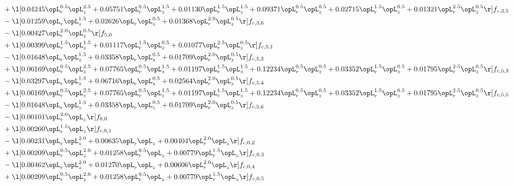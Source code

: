 \begin{alignat}{2}
& + \l[  0.04245 \opL_r^{0.5} \opL_z^{2.5} +  0.05751 \opL_r^{0.5} \opL_z^{1.5} +  0.01130 \opL_r^{1.5} \opL_z^{1.5} +  0.09371 \opL_r^{0.5} \opL_z^{0.5} +  0.02715 \opL_r^{1.5} \opL_z^{0.5} +  0.01321 \opL_r^{2.5} \opL_z^{0.5}  \r] f_{c,3,5} \nonumber \\ 
& - \l[  0.01259 \opL_r \opL_z^{1.5} +  0.02626 \opL_r \opL_z^{0.5} +  0.01368 \opL_r^{2.0} \opL_z^{0.5}  \r] f_{c,3,6} \nonumber \\ 
& - \l[  0.00427 \opL_r^{2.0} \opL_z^{0.5}  \r] f_{5,0} \nonumber \\ 
& + \l[  0.00399 \opL_r^{1.5} \opL_z^{1.5} +  0.01117 \opL_r^{1.5} \opL_z^{0.5} +  0.01077 \opL_r^{2.5} \opL_z^{0.5}  \r] f_{c,5,1} \nonumber \\ 
& - \l[  0.01648 \opL_r \opL_z^{1.5} +  0.03358 \opL_r \opL_z^{0.5} +  0.01709 \opL_r^{2.0} \opL_z^{0.5}  \r] f_{c,5,2} \nonumber \\ 
& + \l[  0.06169 \opL_r^{0.5} \opL_z^{2.5} +  0.07765 \opL_r^{0.5} \opL_z^{1.5} +  0.01197 \opL_r^{1.5} \opL_z^{1.5} +  0.12234 \opL_r^{0.5} \opL_z^{0.5} +  0.03352 \opL_r^{1.5} \opL_z^{0.5} +  0.01795 \opL_r^{2.5} \opL_z^{0.5}  \r] f_{c,5,3} \nonumber \\ 
& - \l[  0.03297 \opL_r \opL_z^{1.5} +  0.06716 \opL_r \opL_z^{0.5} +  0.02564 \opL_r^{2.0} \opL_z^{0.5}  \r] f_{c,5,4} \nonumber \\ 
& + \l[  0.06169 \opL_r^{0.5} \opL_z^{2.5} +  0.07765 \opL_r^{0.5} \opL_z^{1.5} +  0.01197 \opL_r^{1.5} \opL_z^{1.5} +  0.12234 \opL_r^{0.5} \opL_z^{0.5} +  0.03352 \opL_r^{1.5} \opL_z^{0.5} +  0.01795 \opL_r^{2.5} \opL_z^{0.5}  \r] f_{c,5,5} \nonumber \\ 
& - \l[  0.01648 \opL_r \opL_z^{1.5} +  0.03358 \opL_r \opL_z^{0.5} +  0.01709 \opL_r^{2.0} \opL_z^{0.5}  \r] f_{c,5,6} \nonumber \\ 
& - \l[  0.00101 \opL_r^{2.0} \opL_z  \r] f_{0,0} \nonumber \\ 
& + \l[  0.00260 \opL_r^{1.5} \opL_z  \r] f_{c,0,1} \nonumber \\ 
& - \l[  0.00231 \opL_r \opL_z^{2.0} +  0.00635 \opL_r \opL_z +  0.00404 \opL_r^{2.0} \opL_z  \r] f_{c,0,2} \nonumber \\ 
& + \l[  0.00209 \opL_r^{0.5} \opL_z^{2.0} +  0.01258 \opL_r^{0.5} \opL_z +  0.00779 \opL_r^{1.5} \opL_z  \r] f_{c,0,3} \nonumber \\ 
& - \l[  0.00462 \opL_r \opL_z^{2.0} +  0.01270 \opL_r \opL_z +  0.00606 \opL_r^{2.0} \opL_z  \r] f_{c,0,4} \nonumber \\ 
& + \l[  0.00209 \opL_r^{0.5} \opL_z^{2.0} +  0.01258 \opL_r^{0.5} \opL_z +  0.00779 \opL_r^{1.5} \opL_z  \r] f_{c,0,5} \nonumber \\ 

\end{alignat}
